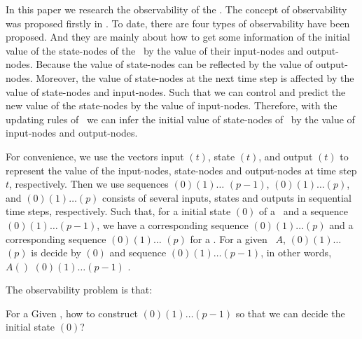 In this paper we research the observability of the \BCNs. The concept of observability was proposed firstly in \cite{cheng2009controllability}. To date, there are four types of observability have been proposed. And they are mainly about how to get some information of the initial value of the state-nodes of the \BCNs\ by the value of their input-nodes and output-nodes. Because the value of state-nodes can be reflected by the value of output-nodes. Moreover, the value of state-nodes at the next time step is affected by the value of state-nodes and input-nodes. Such that we can control and predict the new value of the state-nodes by the value of input-nodes. Therefore, with the updating rules of \BCNs\ we can infer  the initial value of state-nodes of \BCNs\ by the value of input-nodes and output-nodes. %

For convenience, we use the vectors input \Input$(t)$, state \State$(t)$, and output \Output$(t)$ to represent the value of the input-nodes, state-nodes and output-nodes at time step $t$, respectively.
 Then we use   sequences \Input$(0)$\Input$(1)\ldots$
\Input$(p-1)$,  \State$(0) $\State$(1)\ldots$\State$(p)$, and   \Output$(0)$\Output$(1)\ldots$\Output$(p)$ 
 consists of several inputs, states and outputs  in sequential time steps,  respectively. 
 Such that, for a initial state \State$(0)$ of a \BCN\ and a sequence \Input$(0)$\Input$(1)\ldots$\Input$(p-1)$, we have a corresponding  sequence 
\State$(0) $\State$(1)\ldots $\State$(p)$ and a corresponding  sequence \Output$(0) $\Output$(1)\ldots$ \Output$(p)$ for a \BCN.  For a given  \BCN\  $A$,  \Output$(0) $\Output$(1)\ldots$ \Output$(p)$ is decide by
\State$(0)$ and sequence \Input$(0)$\Input$(1)\ldots$\Input$(p-1)$, in other words, $A() $ \Input$(0)$\Input$(1)\ldots$\Input$(p-1)$ . 

The observability problem is that:
\begin{problem}
\label{pro:1}
For a Given  \BCN, how to   construct  \Input$(0)$\Input$(1)\ldots$\Input$(p-1)$ so that we can decide the initial state \State$(0)$?
\end{problem}

